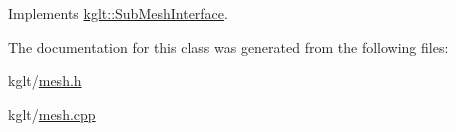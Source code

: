 Implements \hyperlink{classkglt_1_1_sub_mesh_interface_a5ec394f1ae5e362832968a5528a287ec}{kglt\-::\-Sub\-Mesh\-Interface}.



The documentation for this class was generated from the following files\-:\begin{DoxyCompactItemize}
\item 
kglt/\hyperlink{mesh_8h}{mesh.\-h}\item 
kglt/\hyperlink{mesh_8cpp}{mesh.\-cpp}\end{DoxyCompactItemize}
